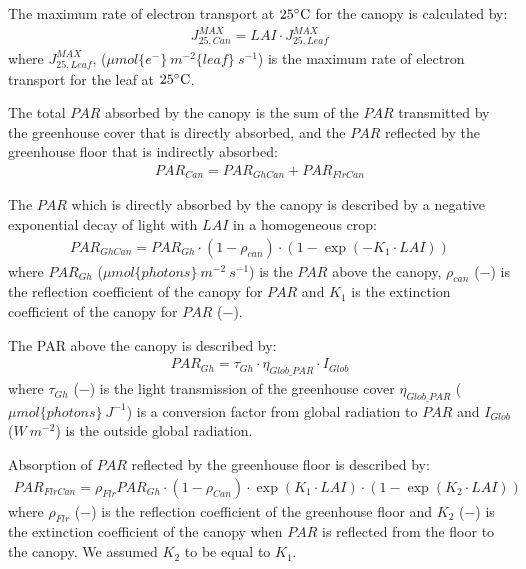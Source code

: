 \documentclass[a4paper]{article}
\numberwithin{equation}{section}
\begin{document}
The maximum rate of electron transport at \( 25 \celsius \) for the canopy is calculated by:
\begin{align}
  J^{MAX}_{25,Can} = LAI \cdot J^{MAX}_{25,Leaf}
\end{align}
where \( J^{MAX}_{25,Leaf} \), (\( \mu mol\{e^-\}\ m^{-2}\{leaf\}\ s^{-1} \)) is the maximum rate of electron transport for the leaf at \( 25 \celsius \).

The total \( PAR \) absorbed by the canopy is the sum of the \( PAR \) transmitted by the greenhouse cover that is directly absorbed, and the \( PAR \) reflected by the greenhouse floor that is indirectly absorbed:
\begin{align}
  PAR_{Can} = PAR_{GhCan} + PAR_{FlrCan}
\end{align}

The \( PAR \) which is directly absorbed by the canopy is described by a negative exponential decay of light with \( LAI \) in a homogeneous crop:
\begin{align}
  PAR_{GhCan} = PAR_{Gh}\cdot (1-\rho_{can})\cdot(1 - \exp \left(-K_1\cdot LAI\right))
\end{align}
where \( PAR_{Gh} \) (\( \mu mol \{photons\}\ m^{-2}\ s^{-1} \)) is the \( PAR \) above the canopy, \( \rho_{can} \) (\( - \)) is the reflection coefficient of the canopy for \( PAR \) and \( K_1 \) is the extinction coefficient of the canopy for \( PAR \) (\( - \)).

The PAR above the canopy is described by:
\begin{align}
  PAR_{Gh} = \tau_{Gh} \cdot \eta_{Glob\_PAR}\cdot I_{Glob}
\end{align}
where \( \tau_{Gh} \) (\( - \)) is the light transmission of the greenhouse cover \( \eta_{Glob\_PAR} \) (\( \mu mol\{photons\}\ J^{-1} \)) is a conversion factor from global radiation to \( PAR \) and \( I_{Glob} \) (\( W\ m^{-2} \)) is the outside global radiation.

Absorption of \( PAR \) reflected by the greenhouse floor is described by:
\begin{align}
  PAR_{FlrCan} = \rho_{Flr}PAR_{Gh}\cdot (1-\rho_{Can})\cdot \exp \left(K_1\cdot LAI\right) \cdot (1 - \exp \left(K_2\cdot LAI\right))
\end{align}
where \( \rho_{Flr} \) (\( - \)) is the reflection coefficient of the greenhouse floor and \( K_2 \) (\( - \)) is the extinction coefficient of the canopy when \( PAR \) is reflected from the floor to the canopy. We assumed \( K_2 \) to be equal to \( K_1 \).
\end{document}
